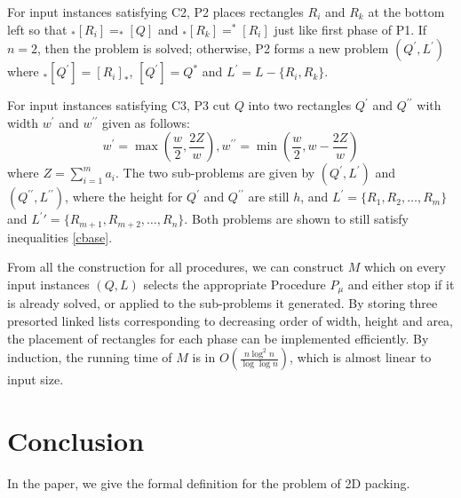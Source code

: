 \documentclass[sigplan,screen,nonacm]{acmart}\settopmatter{printfolios=true,printccs=false,printacmref=false}
\begin{document}
\par For input instances satisfying C2, P2 places rectangles $R_i$ and $R_k$ at the bottom left so that $_*[R_i]=_*[Q]$ and $_*[R_k]=^*[R_i]$ just like first phase of P1. If $n=2$, then the problem is solved; otherwise, P2 forms a new problem $(Q^\prime, L^\prime)$ where $_*[Q^\prime]=[R_i]_*$, $[Q^\prime]=Q^*$ and $L^\prime=L-\{R_i, R_k\}$.
\par For input instances satisfying C3, P3 cut $Q$ into two rectangles $Q^\prime$ and $Q^{\prime\prime}$ with width $w^\prime$ and $w^{\prime\prime}$ given as follows:
\begin{equation}
	w^\prime=\max(\frac{w}{2},\frac{2Z}{w}), w^{\prime\prime}=\min(\frac{w}{2},w-\frac{2Z}{w})
\end{equation}
where $Z=\sum_{i=1}^{m}a_i$. The two sub-problems are given by $(Q^\prime,L^\prime)$ and $(Q^{\prime\prime},L^{\prime\prime})$, where the height for $Q^\prime$ and $Q^{\prime\prime}$ are still $h$, and $L^\prime=\{R_1,R_2,\ldots,R_m\}$ and $L^\prime\prime=\{R_{m+1},R_{m+2},\ldots, R_n\}$. Both problems are shown to still satisfy inequalities \ref{cbase}.
\par From all the construction for all procedures, we can construct $M$ which on every input instances $(Q,L)$ selects the appropriate Procedure $P_\mu$ and either stop if it is already solved, or applied to the sub-problems it generated. By storing three presorted linked lists corresponding to decreasing order of width, height and area, the placement of rectangles for each phase can be implemented efficiently. By induction, the running time of $M$ is in $O(\frac{n\log^2 n}{\log\log n})$, which is almost linear to input size.
\section{Conclusion}
In the paper, we give the formal definition for the problem of 2D packing.


\end{document}
